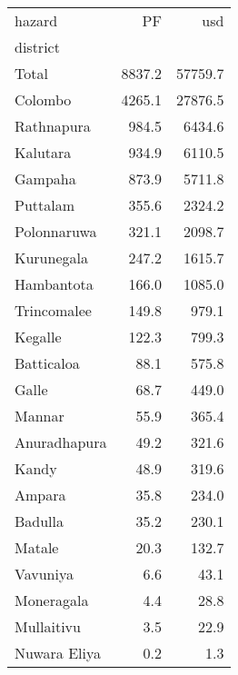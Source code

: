\begin{tabular}{lrr}
\toprule
hazard &      PF &      usd \\
district     &         &          \\
\midrule
Total        &  8837.2 &  57759.7 \\
Colombo      &  4265.1 &  27876.5 \\
Rathnapura   &   984.5 &   6434.6 \\
Kalutara     &   934.9 &   6110.5 \\
Gampaha      &   873.9 &   5711.8 \\
Puttalam     &   355.6 &   2324.2 \\
Polonnaruwa  &   321.1 &   2098.7 \\
Kurunegala   &   247.2 &   1615.7 \\
Hambantota   &   166.0 &   1085.0 \\
Trincomalee  &   149.8 &    979.1 \\
Kegalle      &   122.3 &    799.3 \\
Batticaloa   &    88.1 &    575.8 \\
Galle        &    68.7 &    449.0 \\
Mannar       &    55.9 &    365.4 \\
Anuradhapura &    49.2 &    321.6 \\
Kandy        &    48.9 &    319.6 \\
Ampara       &    35.8 &    234.0 \\
Badulla      &    35.2 &    230.1 \\
Matale       &    20.3 &    132.7 \\
Vavuniya     &     6.6 &     43.1 \\
Moneragala   &     4.4 &     28.8 \\
Mullaitivu   &     3.5 &     22.9 \\
Nuwara Eliya &     0.2 &      1.3 \\
\bottomrule
\end{tabular}
